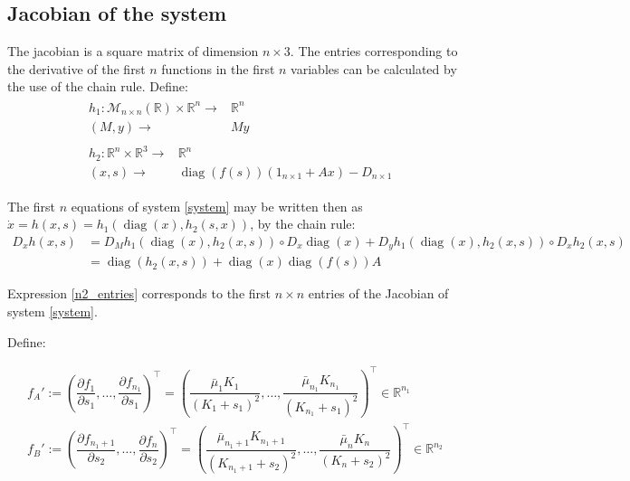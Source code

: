 \documentclass[3p,times]{article}
\newcommand{\R}{\mathbb{R}}
\DeclareMathOperator{\diag}{diag}
\begin{document}
\subsection{Jacobian of the system}
The jacobian is a square matrix of dimension $n\times 3$. The entries corresponding to the derivative of the first $n$ functions in the first $n$ variables can be calculated by the use of the chain rule. Define:
\begin{align*} 
& \begin{array}{rc}
h_1:\mathcal{M}_{n \times n}(\R) \times \R^n \rightarrow & \R^n \\
(M,y) \rightarrow & My
\end{array}  \\
&\begin{array}{rl}
h_2: \R^n \times \R^3  \rightarrow & \R^n \\
(x,s) \rightarrow & \diag(f(s))\left(1_{n\times 1}+ Ax\right)-D_{n\times 1}
\end{array} 	
\end{align*}

The first $n$ equations of system \eqref{system} may be written then as $\dot{x} =  h(x,s) = h_1(\diag(x), h_2(s,x))$, by the chain rule: 
\begin{align} D_xh(x,s) &= D_M h_1(\diag(x),h_2(x,s))\circ D_x \diag (x) + D_yh_1(\diag(x),h_2(x,s))\circ D_xh_2(x,s)  \\ &=
\diag(h_2(x,s))+\diag(x)\diag(f(s))A  \label{n2_entries}
\end{align}

Expression \eqref{n2_entries} corresponds to the first $n\times n$ entries of the Jacobian of system \eqref{system}.

Define:

\begin{align*}
f_A' := \left( \dfrac{\partial f_1}{\partial s_1}, \dots, \dfrac{\partial f_{n_1}}{\partial s_1} \right)^\top = \left(\dfrac{\bar{\mu}_1K_1}{(K_1 + s_1)^2},\dots, \dfrac{\bar{\mu}_{n_1}K_{n_1}}{(K_{n_1} + s_1)^2} \right)^\top \in \R^{n_1} \\
f_B' := \left( \dfrac{\partial f_{n_1+1}}{\partial s_2}, \dots, \dfrac{\partial f_{n}}{\partial s_2} \right)^\top = \left( \dfrac{\bar{\mu}_{n_1+1}K_{n_1+1}}{(K_{n_1+1} + s_2)^2},\dots, \dfrac{\bar{\mu}_{n}K_{n}}{(K_{n} + s_2)^2} \right)^\top \in \R^{n_2}
\end{align*}
\end{document}
